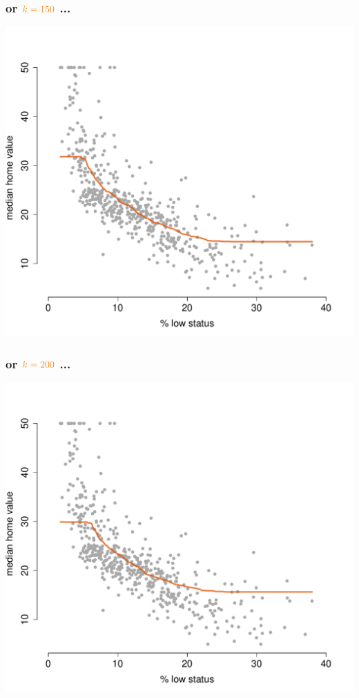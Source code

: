\documentclass{beamer}
\newcommand{\bo}[1]{\textcolor{burntorange}{#1}}
\begin{document}
\begin{frame}[plain]
\frametitle{or $\bo{k=150}$ ...}
\vspace{-8mm}
\begin{center}
\includegraphics[scale=.44]{DaveBostonplotk=150i=5.pdf}
\end{center}
\end{frame}

\begin{frame}[plain]
\frametitle{or $\bo{k=200}$ ...}
\vspace{-8mm}
\begin{center}
\includegraphics[scale=.44]{DaveBostonplotk=200i=6.pdf}
\end{center}
\end{frame}
\end{document}
